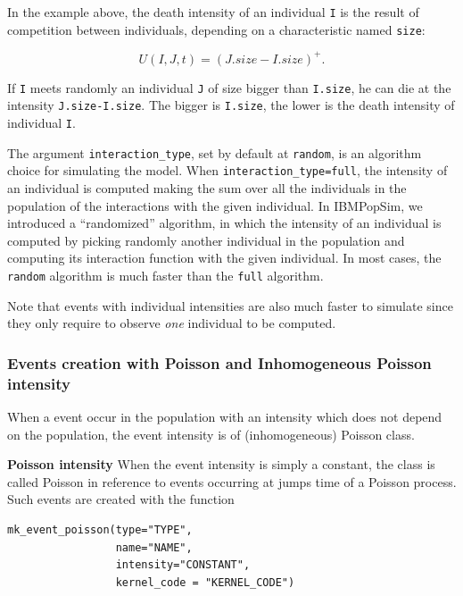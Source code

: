 In the example above, the death intensity of an individual \texttt{I} is the result of competition between individuals, depending on a characteristic named \texttt{size}:

\[U(I,J,t) = (J.size - I.size)^+.\]

If \texttt{I} meets randomly an individual \texttt{J} of size bigger than \texttt{I.size}, he can die at the intensity \texttt{J.size-I.size}. The bigger is \texttt{I.size}, the lower is the death intensity of individual \texttt{I}.

The argument \texttt{interaction\_type}, set by default at \texttt{random}, is an algorithm choice for simulating the model.
When \texttt{interaction\_type=full}, the intensity of an individual is computed making the sum over all the individuals in the population of the interactions with the given individual. In IBMPopSim, we introduced a ``randomized'' algorithm, in which the intensity of an individual is computed by picking randomly another individual in the population and computing its interaction function with the given individual. In most cases, the \texttt{random} algorithm is much faster than the \texttt{full} algorithm.

Note that events with individual intensities are also much faster to simulate since they only require to observe \emph{one} individual to be computed.

\hypertarget{events-creation-with-poisson-and-inhomogeneous-poisson-intensity}{%
\subsubsection{Events creation with Poisson and Inhomogeneous Poisson intensity}\label{events-creation-with-poisson-and-inhomogeneous-poisson-intensity}}

When a event occur in the population with an intensity which does not depend on the population, the event intensity is of (inhomogeneous) Poisson class.

\textbf{Poisson intensity} When the event intensity is simply a constant, the class is called Poisson in reference to events occurring at jumps time of a Poisson process. Such events are created with the function

\begin{verbatim}
mk_event_poisson(type="TYPE",
                 name="NAME",
                 intensity="CONSTANT",
                 kernel_code = "KERNEL_CODE")
\end{verbatim}

